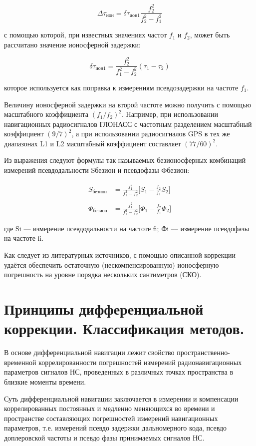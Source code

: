 \documentclass[14pt,a4paper,oneside]{extarticle}
\begin{document}
\[\Delta\tau_{\text{ион}} = \delta \tau_{\text{ион}1}\frac{f_{2}^{2}}{f_{2}^{2}-f_{1}^{2}}\]

с помощью которой, при известных значениях частот $f_1$ и $f_2$, может быть рассчитано значение ионосферной задержки:

\[\delta\tau_{\text{ион}1}=\frac{f_{2}^{2}}{f_{1}^{2}-f_{2}^{2}}\left(\tau_{1}-\tau_{2}\right)\]

которое используется как поправка к измерениям псевдозадержки на частоте $f_1$.

Величину ионосферной задержки на второй частоте можно получить с помощью
масштабного коэффициента $(f_1/f_2)^2$. Например, при использовании навигационных
радиосигналов ГЛОНАСС с частотным разделением масштабный коэффициент $(9/7)^2$, а
при использовании радиосигналов GPS в тех же диапазонах L1 и L2 масштабный
коэффициент составляет $(77/60)^2$.

Из выражения следуют формулы так называемых безионосферных комбинаций
измерений псевдодальности Sбезион и псевдофазы Фбезион:

\[\begin{aligned}S_{\text{безион}} & = \frac{f_{1}^{2}}{f_{1}^{2}-f_{2}^{2}}\Big[S_{1}-\frac{f_{2}}{f_{1}}S_{2}\Big]\\\\\Phi_{\text{безион}} & = \frac{f_{1}^{2}}{f_{1}^{2}-f_{2}^{2}}\Big[\Phi_{1}-\frac{f_{2}}{f_{1}}\Phi_{2}\Big]\end{aligned}\]

где Si –– измерение псевдодальности на частоте fi; Фi –– измерение псевдофазы на частоте fi.

Как следует из литературных источников, с помощью описанной коррекции удаётся обеспечить остаточную (нескомпенсированную) ионосферную погрешность на уровне порядка нескольких сантиметров (СКО).

\section{Принципы дифференциальной коррекции. Классификация методов.}

В основе дифференциальной навигации лежит свойство пространственно-временной коррелированности погрешностей измерений радионавигационных параметров сигналов НС, проведенных в различных точках пространства в близкие моменты времени.

Суть дифференциальной навигации заключается в измерении и компенсации коррелированных постоянных и медленно меняющихся во времени и пространстве составляющих погрешностей измерений навигационных параметров, т.е. измерений псевдо задержки дальномерного кода, псевдо доплеровской частоты и псевдо фазы принимаемых сигналов НС.
\end{document}
